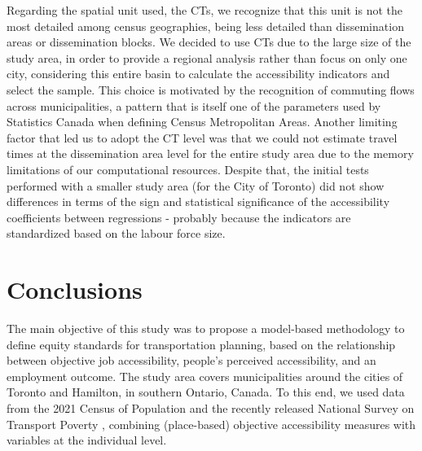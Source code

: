 \documentclass[preprint, 3p,
authoryear]{elsarticle} %
\begin{document}
Regarding the spatial unit used, the CTs, we recognize that this unit is
not the most detailed among census geographies, being less detailed than
dissemination areas or dissemination blocks. We decided to use CTs due
to the large size of the study area, in order to provide a regional
analysis rather than focus on only one city, considering this entire
basin to calculate the accessibility indicators and select the sample.
This choice is motivated by the recognition of commuting flows across
municipalities, a pattern that is itself one of the parameters used by
Statistics Canada when defining Census Metropolitan Areas. Another
limiting factor that led us to adopt the CT level was that we could not
estimate travel times at the dissemination area level for the entire
study area due to the memory limitations of our computational resources.
Despite that, the initial tests performed with a smaller study area (for
the City of Toronto) did not show differences in terms of the sign and
statistical significance of the accessibility coefficients between
regressions - probably because the indicators are standardized based on
the labour force size.

\section{Conclusions}\label{conclusions}

The main objective of this study was to propose a model-based
methodology to define equity standards for transportation planning,
based on the relationship between objective job accessibility, people's
perceived accessibility, and an employment outcome. The study area
covers municipalities around the cities of Toronto and Hamilton, in
southern Ontario, Canada. To this end, we used data from the 2021 Census
of Population and the recently released National Survey on Transport
Poverty \citep{tiznado-aitken}, combining (place-based) objective
accessibility measures with variables at the individual level.
\end{document}
